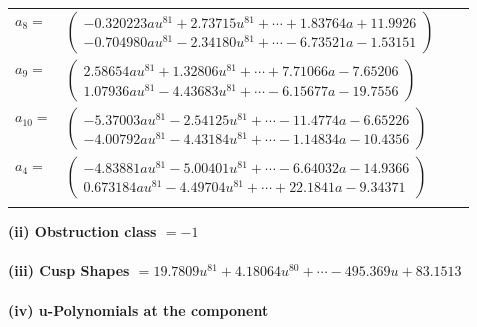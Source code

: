 \documentclass[1p]{elsarticle_modified}
\theoremstyle{definition}
\begin{document}
\begin{tabular}{m{7pt} m{180pt} m{7pt} m{180pt} }
\flushright $a_{8}=$&$\begin{pmatrix}-0.320223 a u^{81}+2.73715 u^{81}+\cdots+1.83764 a+11.9926\\-0.704980 a u^{81}-2.34180 u^{81}+\cdots-6.73521 a-1.53151\end{pmatrix}$ \\
\flushright $a_{9}=$&$\begin{pmatrix}2.58654 a u^{81}+1.32806 u^{81}+\cdots+7.71066 a-7.65206\\1.07936 a u^{81}-4.43683 u^{81}+\cdots-6.15677 a-19.7556\end{pmatrix}$ \\
\flushright $a_{10}=$&$\begin{pmatrix}-5.37003 a u^{81}-2.54125 u^{81}+\cdots-11.4774 a-6.65226\\-4.00792 a u^{81}-4.43184 u^{81}+\cdots-1.14834 a-10.4356\end{pmatrix}$ \\
\flushright $a_{4}=$&$\begin{pmatrix}-4.83881 a u^{81}-5.00401 u^{81}+\cdots-6.64032 a-14.9366\\0.673184 a u^{81}-4.49704 u^{81}+\cdots+22.1841 a-9.34371\end{pmatrix}$\\&\end{tabular}
\flushleft \textbf{(ii) Obstruction class $= -1$}\\~\\
\flushleft \textbf{(iii) Cusp Shapes $= 19.7809 u^{81}+4.18064 u^{80}+\cdots-495.369 u+83.1513$}\\~\\
\newpage\renewcommand{\arraystretch}{1}
\flushleft \textbf{(iv) u-Polynomials at the component}\newline \\
\end{document}
